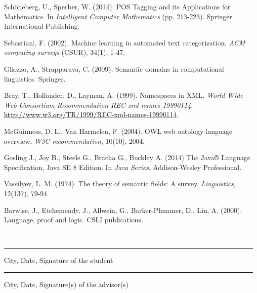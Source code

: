\documentclass[12pt,a4paper]{article}
\begin{document}
\begin{thebibliography}{50}
 Sch{\"o}neberg, U., Sperber, W. (2014). POS Tagging and its Applications for Mathematics. In \emph{Intelligent Computer Mathematics} (pp. 213-223). Springer International Publishing.

 Sebastiani, F. (2002). Machine learning in automated text categorization. \emph{ACM computing surveys} (CSUR), 34(1), 1-47.

 Gliozzo, A., Strapparava, C. (2009). Semantic domains in computational linguistics. Springer.

 Bray, T., Hollander, D., Layman, A. (1999). Namespaces in XML. \emph{World Wide Web Consortium Recommendation REC-xml-names-19990114}. \url{http://www.w3.org/TR/1999/REC-xml-names-19990114}.

 McGuinness, D. L., Van Harmelen, F. (2004). OWL web ontology language overview. \emph{W3C recommendation}, 10(10), 2004.

 Gosling J., Joy B., Steele G., Bracha G., Buckley A. (2014) The Java® Language Specification, Java SE 8 Edition. In \emph{Java Series}. Addison-Wesley Professional.

 Vassilyev, L. M. (1974). The theory of semantic fields: A survey. \emph{Linguistics}, 12(137), 79-94.

 Barwise, J., Etchemendy, J., Allwein, G., Barker-Plummer, D., Liu, A. (2000). Language, proof and logic. CSLI publications.


\end{thebibliography}


\newpage

\ \\

\vspace{3cm}
\noindent\rule{10cm}{0.4pt}

City, Date, Signature of the student

\vspace{2cm}
\noindent\rule{10cm}{0.4pt}

City, Date, Signature(s) of the advisor(s)
\end{document}
